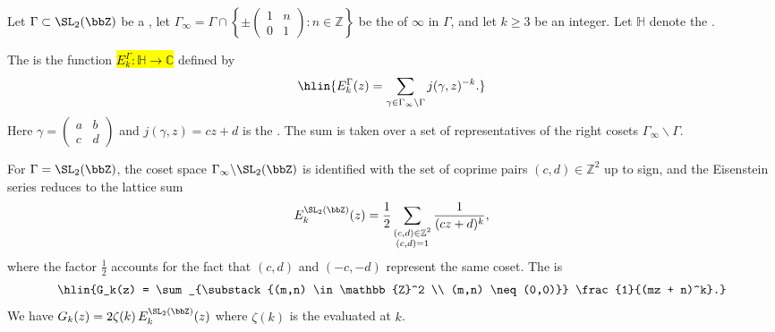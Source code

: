 \begin{definition}
\label{definition:eisenstein_series_of_weight_k_for_a_congruence_subgroup_of_SL_2_Z}
Let $\Gamma \subset \SL_2(\bbZ)$ be a , let $\Gamma_\infty = \Gamma \cap \left\{ \pm \begin{pmatrix} 1 & n \\ 0 & 1 \end{pmatrix} : n \in \mathbb{Z} \right\}$ be the  of $\infty$ in $\Gamma$, and let $k \geq 3$ be an integer. Let $\mathbb{H}$ denote the .

The  is the function \hl{$E_k^\Gamma : \mathbb{H} \to \mathbb{C}$} defined by
$$\hlin{E_k^\Gamma(z) = \sum_{\gamma \in \Gamma_\infty \backslash \Gamma} j(\gamma, z)^{-k}.}$$
Here $\gamma = \begin{pmatrix} a & b \\ c & d \end{pmatrix}$ and $j(\gamma, z) = cz + d$ is the . The sum is taken over a set of representatives of the right cosets $\Gamma_\infty \backslash \Gamma$.

For $\Gamma = \SL_2(\bbZ)$, the coset space $\Gamma_\infty \backslash \SL_2(\bbZ)$ is identified with the set of coprime pairs $(c,d) \in \mathbb{Z}^2$ up to sign, and the Eisenstein series reduces to the lattice sum
$$E_k^{\SL_2(\bbZ)}(z) = \frac{1}{2} \sum_{\substack{(c,d) \in \mathbb{Z}^2 \\ (c,d) = 1}} \frac{1}{(cz + d)^k},$$
where the factor $\frac{1}{2}$ accounts for the fact that $(c,d)$ and $(-c,-d)$ represent the same coset. The  is
$$\hlin{G_k(z) = \sum_{\substack{(m,n) \in \mathbb{Z}^2 \\ (m,n) \neq (0,0)}} \frac{1}{(mz + n)^k}.}$$
We have $G_k(z) = 2\zeta(k) \, E_k^{\SL_2(\bbZ)}(z)$  where $\zeta(k)$ is the  evaluated at $k$.
\end{definition}